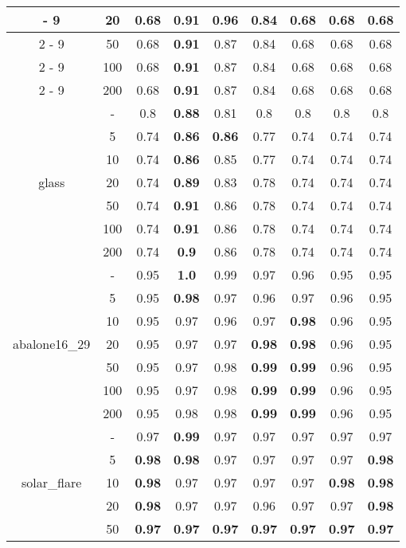 \documentclass{article}%
\begin{document}
\begin{longtable}{c|c|ccccccc}
{-%
9}%
&20&0.68&0.91&\textbf{0.96}&0.84&0.68&0.68&0.68\\%
\cline{2%
-%
9}%
&50&0.68&\textbf{0.91}&0.87&0.84&0.68&0.68&0.68\\%
\cline{2%
-%
9}%
&100&0.68&\textbf{0.91}&0.87&0.84&0.68&0.68&0.68\\%
\cline{2%
-%
9}%
&200&0.68&\textbf{0.91}&0.87&0.84&0.68&0.68&0.68\\%
\hline%
\multirow{7}{*}{glass}&{-}&0.8&\textbf{0.88}&0.81&0.8&0.8&0.8&0.8\\%
\cline{2%
-%
9}%
&5&0.74&\textbf{0.86}&\textbf{0.86}&0.77&0.74&0.74&0.74\\%
\cline{2%
-%
9}%
&10&0.74&\textbf{0.86}&0.85&0.77&0.74&0.74&0.74\\%
\cline{2%
-%
9}%
&20&0.74&\textbf{0.89}&0.83&0.78&0.74&0.74&0.74\\%
\cline{2%
-%
9}%
&50&0.74&\textbf{0.91}&0.86&0.78&0.74&0.74&0.74\\%
\cline{2%
-%
9}%
&100&0.74&\textbf{0.91}&0.86&0.78&0.74&0.74&0.74\\%
\cline{2%
-%
9}%
&200&0.74&\textbf{0.9}&0.86&0.78&0.74&0.74&0.74\\%
\hline%
\multirow{7}{*}{abalone16\_29}&{-}&0.95&\textbf{1.0}&0.99&0.97&0.96&0.95&0.95\\%
\cline{2%
-%
9}%
&5&0.95&\textbf{0.98}&0.97&0.96&0.97&0.96&0.95\\%
\cline{2%
-%
9}%
&10&0.95&0.97&0.96&0.97&\textbf{0.98}&0.96&0.95\\%
\cline{2%
-%
9}%
&20&0.95&0.97&0.97&\textbf{0.98}&\textbf{0.98}&0.96&0.95\\%
\cline{2%
-%
9}%
&50&0.95&0.97&0.98&\textbf{0.99}&\textbf{0.99}&0.96&0.95\\%
\cline{2%
-%
9}%
&100&0.95&0.97&0.98&\textbf{0.99}&\textbf{0.99}&0.96&0.95\\%
\cline{2%
-%
9}%
&200&0.95&0.98&0.98&\textbf{0.99}&\textbf{0.99}&0.96&0.95\\%
\hline%
\multirow{7}{*}{solar\_flare}&{-}&0.97&\textbf{0.99}&0.97&0.97&0.97&0.97&0.97\\%
\cline{2%
-%
9}%
&5&\textbf{0.98}&\textbf{0.98}&0.97&0.97&0.97&0.97&\textbf{0.98}\\%
\cline{2%
-%
9}%
&10&\textbf{0.98}&0.97&0.97&0.97&0.97&\textbf{0.98}&\textbf{0.98}\\%
\cline{2%
-%
9}%
&20&\textbf{0.98}&0.97&0.97&0.96&0.97&0.97&\textbf{0.98}\\%
\cline{2%
-%
9}%
&50&\textbf{0.97}&\textbf{0.97}&\textbf{0.97}&\textbf{0.97}&\textbf{0.97}&\textbf{0.97}&\textbf{0.97}\\%

\end{longtable}
\end{document}

